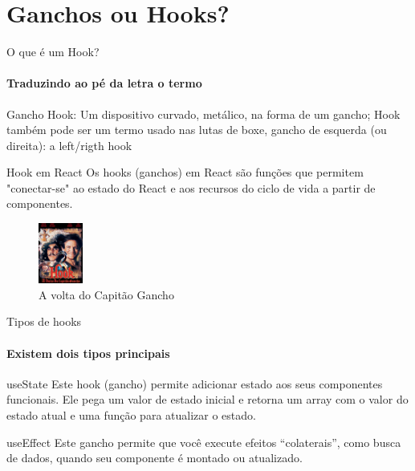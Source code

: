 \documentclass[13pt, xcolor={dvipsnames,svgnames}, portuguese]{beamer}
\begin{document}
\section{Ganchos ou Hooks?}
\begin{frame}{O que é um Hook?}
\framesubtitle{Traduzindo ao pé da letra o termo}
	\begin{block}{Gancho}
       Hook: Um dispositivo curvado, metálico, na forma de um gancho;
       Hook também pode ser um termo usado nas lutas de boxe, gancho de esquerda (ou direita): a left/rigth hook
	\end{block}
\pause
	\begin{block}{Hook em React}
       Os hooks (ganchos) em React são funções que permitem "conectar-se" ao estado do React e aos recursos do ciclo de vida a partir de componentes.
	\end{block}
\pause
\begin{figure}
\includegraphics[width=0.13\textwidth]{Figuras/hookCaptain.png}
\caption{A volta do Capitão Gancho}
\end{figure}
\end{frame}


\begin{frame}{Tipos de hooks}
\framesubtitle{Existem dois tipos principais}
	\begin{block}{useState }
       Este hook (gancho) permite adicionar estado aos seus componentes funcionais. Ele pega um valor de estado inicial e retorna um array com o valor do estado atual e uma função para atualizar o estado.
	\end{block}	
	\pause
	\begin{block}{useEffect }
       Este gancho permite que você execute efeitos ``colaterais'', como busca de dados, quando seu componente é montado ou atualizado.
	\end{block}		
	
\end{frame}

\end{document}

